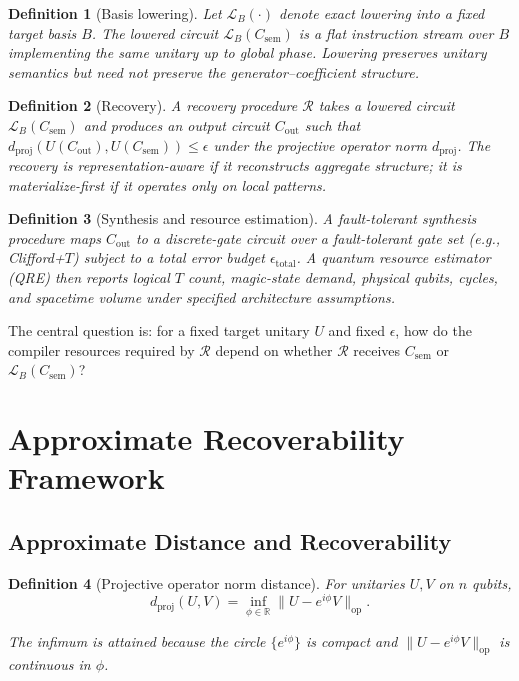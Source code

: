 \documentclass[aps,prx,reprint,floatfix,superscriptaddress]{revtex4-2}
\newtheorem{definition}{Definition}
\begin{document}
\begin{definition}[Basis lowering]
\label{def:lowering}
Let $\mathcal{L}_B(\cdot)$ denote exact lowering into a fixed target basis
$B$. The lowered circuit $\mathcal{L}_B(C_{\mathrm{sem}})$ is a flat
instruction stream over $B$ implementing the same unitary up to global
phase. Lowering preserves unitary semantics but need not preserve the
generator--coefficient structure.
\end{definition}

\begin{definition}[Recovery]
\label{def:recovery}
A recovery procedure $\mathcal{R}$ takes a lowered circuit
$\mathcal{L}_B(C_{\mathrm{sem}})$ and produces an output circuit
$C_{\mathrm{out}}$ such that
$d_{\mathrm{proj}}(U(C_{\mathrm{out}}), U(C_{\mathrm{sem}})) \leq \epsilon$
under the projective operator norm $d_{\mathrm{proj}}$. The recovery is
\emph{representation-aware} if it reconstructs aggregate structure; it is
\emph{materialize-first} if it operates only on local patterns.
\end{definition}

\begin{definition}[Synthesis and resource estimation]
\label{def:synthesis}
A fault-tolerant synthesis procedure maps $C_{\mathrm{out}}$ to a
discrete-gate circuit over a fault-tolerant gate set (e.g., Clifford+$T$)
subject to a total error budget $\epsilon_{\mathrm{total}}$. A quantum
resource estimator (QRE) then reports logical $T$ count, magic-state
demand, physical qubits, cycles, and spacetime volume under specified
architecture assumptions.
\end{definition}

The central question is: for a fixed target unitary $U$ and fixed
$\epsilon$, how do the compiler resources required by $\mathcal{R}$
depend on whether $\mathcal{R}$ receives $C_{\mathrm{sem}}$ or
$\mathcal{L}_B(C_{\mathrm{sem}})$?


\section{Approximate Recoverability Framework}
\label{sec:framework}

\subsection{Approximate Distance and Recoverability}

\begin{definition}[Projective operator norm distance]
\label{def:proj-norm}
For unitaries $U, V$ on $n$ qubits,
\begin{equation}
\label{eq:proj-norm}
  d_{\mathrm{proj}}(U, V) = \inf_{\phi \in \mathbb{R}} \|U - e^{i\phi} V\|_{\mathrm{op}}.
\end{equation}
  
The infimum is attained because the circle $\{e^{i\phi}\}$ is compact and
$\|U - e^{i\phi}V\|_{\mathrm{op}}$ is continuous in $\phi$.
\end{definition}
\end{document}
